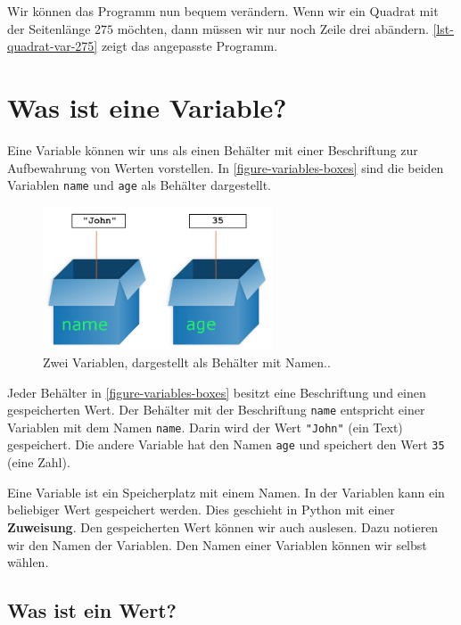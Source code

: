 Wir können das Programm nun bequem verändern. Wenn wir ein Quadrat mit der Seitenlänge $275$ möchten, dann müssen wir nur noch Zeile drei abändern. \autoref{lst-quadrat-var-275} zeigt das angepasste Programm.

\section{Was ist eine Variable?}

Eine Variable können wir uns als einen Behälter mit einer Beschriftung zur Aufbewahrung von Werten vorstellen. In \autoref{figure-variables-boxes} sind die beiden Variablen \lstinline{name} und \lstinline{age} als Behälter dargestellt.

\begin{figure}[htb]
\centering
\includegraphics[height=4.25cm]{boxesVariable}
\caption{Zwei Variablen, dargestellt als Behälter mit Namen.\protect\footnotemark.}
\label{figure-variables-boxes}
\end{figure}


Jeder Behälter in \autoref{figure-variables-boxes} besitzt eine Beschriftung und einen gespeicherten Wert. Der Behälter mit der Beschriftung \lstinline{name} entspricht einer Variablen mit dem Namen \lstinline{name}. Darin wird der Wert \lstinline{"John"} (ein Text) gespeichert. Die andere Variable hat den Namen \lstinline{age} und speichert den Wert \lstinline{35} (eine Zahl).

\begin{definition}[Variable]
Eine Variable ist ein Speicherplatz mit einem Namen. In der Variablen kann ein beliebiger Wert gespeichert werden. Dies geschieht in Python mit einer \textbf{Zuweisung}. Den gespeicherten Wert können wir auch auslesen. Dazu notieren wir den Namen der Variablen. Den Namen einer Variablen können wir selbst wählen.
\end{definition}

\subsection{Was ist ein Wert?}

